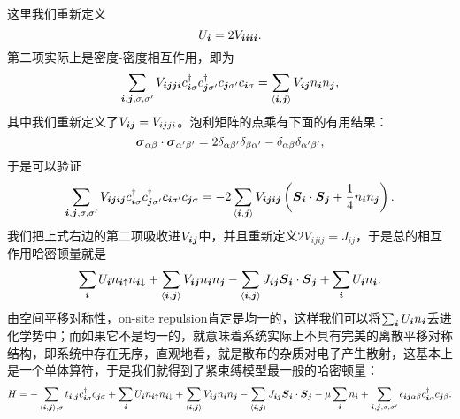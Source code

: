 这里我们重新定义
\begin{equation}
    U_{\vb*{i}} = 2 V_{\vb*{i} \vb*{i} \vb*{i} \vb*{i}}.
\end{equation}
第二项实际上是密度-密度相互作用，即为
\[
    \sum_{\vb*{i}, \vb*{j}, \sigma, \sigma'} V_{\vb*{i} \vb*{j} \vb*{j} \vb*{i}} c^\dagger_{\vb*{i} \sigma} c^\dagger_{\vb*{j} \sigma'} c_{\vb*{j} \sigma'} c_{\vb*{i} \sigma} = \sum_{\langle \vb*{i}, \vb*{j} \rangle} V_{\vb*{i} \vb*{j}}n_{\vb*{i}} n_{\vb*{j}},
\]
其中我们重新定义了$V_{\vb*{i} \vb*{j}} = V_{ijji}$。泡利矩阵的点乘有下面的有用结果：
\begin{equation}
    \vb*{\sigma}_{\alpha \beta} \cdot \vb*{\sigma}_{\alpha' \beta'} = 2 \delta_{\alpha \beta'} \delta_{\beta \alpha'} - \delta_{\alpha \beta} \delta_{\alpha' \beta'},
    \label{eq:pauli-dot-product}
\end{equation}
于是可以验证
\[
    \sum_{\vb*{i}, \vb*{j}, \sigma, \sigma'} V_{\vb*{i} \vb*{j} \vb*{i} \vb*{j}} c^\dagger_{\vb*{i} \sigma} c^\dagger_{\vb*{j} \sigma'} c_{\vb*{i} \sigma'} c_{\vb*{j} \sigma} = - 2 \sum_{\langle \vb*{i}, \vb*{j} \rangle} V_{\vb*{i} \vb*{j} \vb*{i} \vb*{j}} \left( \vb*{S}_{\vb*{i}} \cdot \vb*{S}_{\vb*{j}} + \frac{1}{4}n_{\vb*{i}} n_{\vb*{j}} \right).
\]
我们把上式右边的第二项吸收进$V_{\vb*{i} \vb*{j}}$中，并且重新定义$2V_{ijij}=J_{ij}$，于是总的相互作用哈密顿量就是
\[
    \sum_{\vb*{i}} U_{\vb*{i}} n_{\vb*{i} \uparrow} n_{\vb*{i} \downarrow} + \sum_{\langle \vb*{i}, \vb*{j} \rangle} V_{\vb*{i} \vb*{j}}n_{\vb*{i}} n_{\vb*{j}} - \sum_{\langle \vb*{i}, \vb*{j} \rangle} J_{\vb*{i} \vb*{j}} \vb*{S}_{\vb*{i}} \cdot \vb*{S}_{\vb*{j}} + \sum_{\vb*{i}} U_{\vb*{i}}n_{\vb*{i}}.
\]
由空间平移对称性，on-site repulsion肯定是均一的，这样我们可以将$\sum_{\vb*{i}} U_{\vb*{i}}n_{\vb*{i}}$丢进化学势中；而如果它不是均一的，就意味着系统实际上不具有完美的离散平移对称结构，即系统中存在无序，直观地看，就是散布的杂质对电子产生散射，这基本上是一个单体算符，于是我们就得到了紧束缚模型最一般的哈密顿量：
\begin{equation}
    H = - \sum_{\langle \vb*{i}, \vb*{j} \rangle, \sigma} t_{\vb*{i}, \vb*{j}} c^\dagger_{\vb*{i} \sigma} c_{\vb*{j} \sigma} 
    + \sum_{\vb*{i}} U_{\vb*{i}} n_{\vb*{i} \uparrow} n_{\vb*{i} \downarrow} 
    + \sum_{\langle \vb*{i}, \vb*{j} \rangle} V_{\vb*{i} \vb*{j}} n_{\vb*{i}} n_{\vb*{j}} - \sum_{\langle \vb*{i}, \vb*{j} \rangle} J_{\vb*{i} \vb*{j}} \vb*{S}_{\vb*{i}} \cdot \vb*{S}_{\vb*{j}} 
    - \mu \sum_{\vb*{i}} n_{\vb*{i}} + \sum_{\vb*{i}, \vb*{j}, \sigma, \sigma'} \epsilon_{\vb*{i} \vb*{j} \alpha \beta} c^\dagger_{\vb*{i} \alpha} c_{\vb*{j} \beta}.  
    \label{eq:tight-binding-single-band-interaction}
\end{equation}
